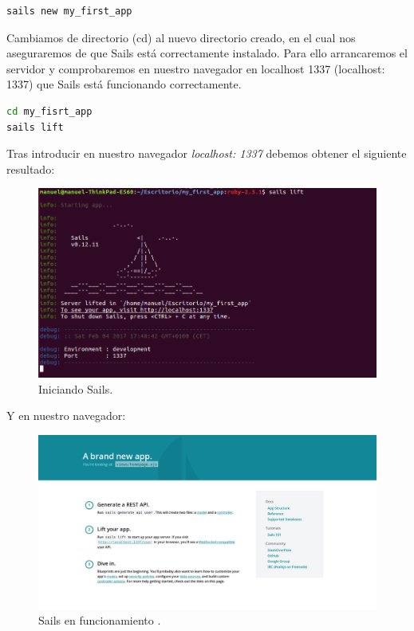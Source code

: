 \begin{lstlisting}[language=bash]
sails new my_first_app
\end{lstlisting}

Cambiamos de directorio (cd) al nuevo directorio creado, en el cual nos aseguraremos de que Sails está correctamente instalado. Para ello arrancaremos el servidor y comprobaremos en nuestro navegador en localhost 1337 (localhost: 1337) que Sails está funcionando correctamente.\\


\begin{lstlisting}[language=bash]
cd my_fisrt_app
sails lift
\end{lstlisting}


Tras introducir en nuestro navegador \emph{localhost: 1337} debemos obtener el siguiente resultado:


\begin{figure}[H]
  \begin{center}
    \includegraphics[scale=0.3]{imagenes/running_sails.png}
  \end{center}
  \label{fig:logo}
 \caption{Iniciando Sails.}
\end{figure}


Y en nuestro navegador:\\

\begin{figure}[H]
  \begin{center}
    \includegraphics[scale=0.3]{imagenes/browser_sails.png}
  \end{center}
  \label{fig:logo}
 \caption{Sails en funcionamiento \protect\footnotemark.}
\end{figure}



